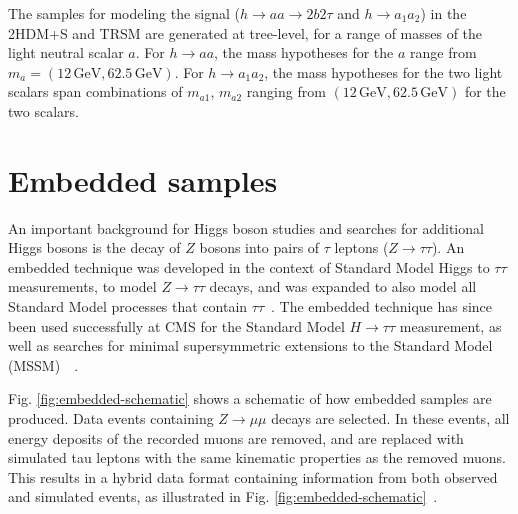 The samples for modeling the signal ($h \rightarrow aa \rightarrow 2b2\tau$ and $h\rightarrow a_1 a_2$) in the 2HDM+S and TRSM are generated at tree-level, for a range of masses of the light neutral scalar $a$. For $h \rightarrow aa$, the mass hypotheses for the $a$ range from $m_a = (12 \,\text{GeV}, 62.5 \,\text{GeV})$. For $h \rightarrow a_1 a_2$, the mass hypotheses for the two light scalars span combinations of $m_{a1}$, $m_{a2}$ ranging from $(12 \,\text{GeV}, 62.5 \,\text{GeV})$ for the two scalars.


\section{Embedded samples}
\label{section:embedded-samples}
An important background for Higgs boson studies and searches for additional Higgs bosons is the decay of $Z$ bosons into pairs of $\tau$ leptons ($Z \rightarrow \tau\tau$). An embedded technique was developed in the context of Standard Model Higgs to $\tau\tau$ measurements, to model $Z \rightarrow \tau\tau$ decays, and was expanded to also model all Standard Model processes that contain $\tau\tau$~\cite{CMS-TAU-18-001}. The embedded technique has since been used successfully at CMS for the Standard Model $H \rightarrow \tau\tau$ measurement, as well as searches for minimal supersymmetric extensions to the Standard Model (MSSM)~\cite{CMS-HIG-13-021}~\cite{CMS-HIG-19-010}.

Fig. \ref{fig:embedded-schematic} shows a schematic of how embedded samples are produced. Data events containing $Z \rightarrow \mu\mu$ decays are selected. In these events, all energy deposits of the recorded muons are removed, and are replaced with simulated tau leptons with the same kinematic properties as the removed muons. This results in a hybrid data format containing information from both observed and simulated events, as illustrated in Fig. \ref{fig:embedded-schematic}~\cite{CMS-TAU-18-001}.

